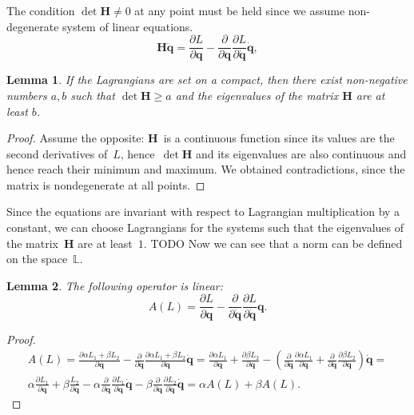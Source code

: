 \documentclass[12pt]{paper}
\newtheorem{lemma}{Lemma}
\newtheorem{proof}{Proof}
\begin{document}
The condition $\det \mathbf{H} \neq 0$ at any point  must be held since we assume non-degenerate system of linear equations.
\begin{equation}
\label{eq:linear_equation_acc}
\mathbf{H}\ddot{\mathbf{q}} 
= \frac{\partial L}{\partial \mathbf{q}}-\frac{\partial}{\partial \mathbf{q}} \frac{\partial L}{\partial \dot{\mathbf{q}}} \dot{\mathbf{q}},
\end{equation}

\begin{lemma} \label{lemma1}
If the Lagrangians are set on a compact, then there exist non-negative numbers $a, b$ such that $\det \mathbf{H} \ge a$ and the eigenvalues of the matrix $\mathbf{H}$ are at least $b$.
\end{lemma}
\begin{proof}
Assume the opposite: $\mathbf{H}$~is a continuous function since its values are the second derivatives of~$L$, hence~$\det \mathbf{H}$ and its eigenvalues are also continuous and hence reach their minimum and maximum. We obtained contradictions, since the matrix is nondegenerate at all points.
\end{proof}


Since the equations are invariant with respect to Lagrangian multiplication by a constant,
we can choose Lagrangians for the systems such that the eigenvalues of the matrix~$\mathbf{H}$ are at
least~$1$. TODO Now we can see that a norm can be defined on the space~$\mathbb{L}$. 

\begin{lemma} \label{lemma2}
The following operator is linear:
\[A (L) = \frac{\partial L}{\partial \mathbf{q}}-\frac{\partial}{\partial \dot{\mathbf{q}}} \frac{\partial L}{\partial \dot{\mathbf{q}}} \mathbf{q}.
\]
\end{lemma}
\begin{proof}
\[
\begin{split}
A (L) = 
\frac{\partial \alpha L_1 + \beta L_2}{\partial \mathbf{q}}-\frac{\partial}{\partial \dot{\mathbf{q}}} \frac{\partial \alpha L_1 + \beta L_2}{\partial \dot{\mathbf{q}}} \dot{\mathbf{q}} = 
\frac{\partial \alpha L_1}{\partial \mathbf{q}} + \frac{\partial\beta L_2}{\partial \mathbf{q}} - \left(\frac{\partial}{\partial \dot{\mathbf{q}}} \frac{\partial \alpha L_1}{\partial \dot{\mathbf{q}}} + \frac{\partial}{\partial \dot{\mathbf{q}}} \frac{\partial \beta L_2}{\partial \dot{\mathbf{q}}}\right) \dot{\mathbf{q}} = 
\\
\alpha\frac{\partial  L_1 }{\partial \mathbf{q}} + \beta\frac{L_2}{\partial \mathbf{q}} -  \alpha\frac{\partial}{\partial \dot{\mathbf{q}}} \frac{\partial L_1}{\partial \dot{\mathbf{q}}}\dot{\mathbf{q}} -  \beta\frac{\partial}{\partial \dot{\mathbf{q}}} \frac{\partial L_2}{\partial \dot{\mathbf{q}}} \dot{\mathbf{q}} = 
\alpha A(L) + \beta A(L).
\end{split}
\]
\end{proof}
\end{document}

